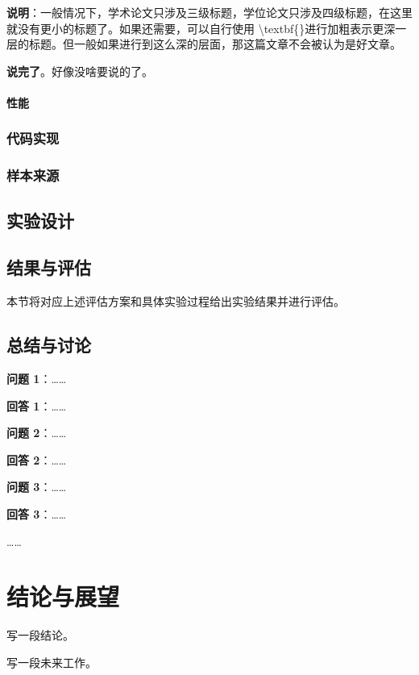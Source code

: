 \documentclass[14pt]{jnuthesis}
\begin{document}
\textbf{说明}：一般情况下，学术论文只涉及三级标题，学位论文只涉及四级标题，在这里就没有更小的标题了。如果还需要，可以自行使用 \textbackslash textbf\{\}进行加粗表示更深一层的标题。但一般如果进行到这么深的层面，那这篇文章不会被认为是好文章。

\textbf{说完了}。好像没啥要说的了。

\subsubsection{性能}

\subsection{代码实现}

\subsection{样本来源}

\section{实验设计}

\section{结果与评估}

本节将对应上述评估方案和具体实验过程给出实验结果并进行评估。

\section{总结与讨论} %

\textbf{问题 1}：……

\textbf{回答 1}：……

\textbf{问题 2}：……

\textbf{回答 2}：……

\textbf{问题 3}：……

\textbf{回答 3}：……

……

\chapter{结论与展望}
\label{chap:5}

写一段结论。

写一段未来工作。

\appendix
\end{document}
